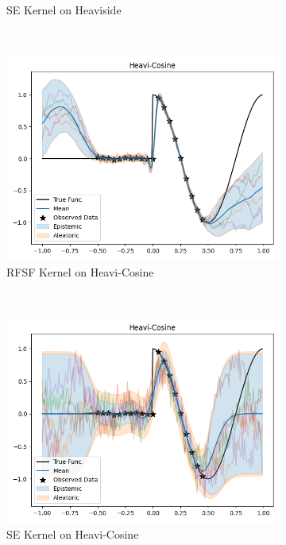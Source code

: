 \begin{figure}
\begin{subfigure}{0.49\linewidth}
			\caption{\acs{SE} Kernel on Heaviside}
			\label{fig:syntheticResultPlotSeHeaviside}
		\end{subfigure}
		\\[0.5cm]
		\begin{subfigure}{0.49\linewidth}
			\centering
			\includegraphics[width=\linewidth, height=0.618033988749895\linewidth]{graphics/generated/gp-heavicosine-rfsf.png}  %
			\caption{\acs{RFSF} Kernel on Heavi-Cosine}
		\end{subfigure}
		~
		\begin{subfigure}{0.49\linewidth}
			\centering
			\includegraphics[width=\linewidth, height=0.618033988749895\linewidth]{graphics/generated/gp-heavicosine-rbf.png}  %
			\caption{\acs{SE} Kernel on Heavi-Cosine}
			\label{fig:syntheticResultPlotSeHeaviCosine}
		\end{subfigure}
		\\[0.5cm]
		\begin{subfigure}{0.49\linewidth}

\end{subfigure}
\end{figure}
